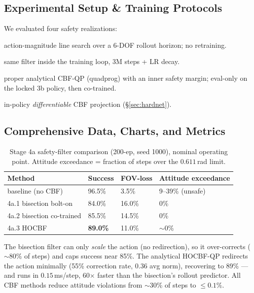 \documentclass[11pt]{article}
\begin{document}
\subsection{Experimental Setup \& Training Protocols}
We evaluated four safety realizations:
\begin{description}[nosep,leftmargin=1.4em]
  \item[4a.1 Bisection bolt-on] action-magnitude line search over a 6-DOF
  rollout horizon; no retraining.
  \item[4a.2 Bisection co-trained] same filter inside the training loop, 3M
  steps + LR decay.
  \item[4a.3 HOCBF] proper analytical CBF-QP (quadprog) with an inner safety
  margin; eval-only on the locked 3b policy, then co-trained.
  \item[4a.4 HardNet] in-policy \emph{differentiable} CBF projection
  (\S\ref{sec:hardnet}).
\end{description}

\subsection{Comprehensive Data, Charts, and Metrics}
\begin{table}[H]\centering\small
\caption{Stage 4a safety-filter comparison (200-ep, seed 1000), nominal
operating point. Attitude exceedance = fraction of steps over the $0.611\,$rad
limit.}
\begin{tabular}{@{}llll@{}}
\toprule
Method & Success & FOV-loss & Attitude exceedance \\
\midrule
baseline (no CBF) & 96.5\% & 3.5\% & 9--39\% (unsafe) \\
4a.1 bisection bolt-on & 84.0\% & 16.0\% & 0\% \\
4a.2 bisection co-trained & 85.5\% & 14.5\% & 0\% \\
4a.3 HOCBF & \textbf{89.0\%} & 11.0\% & $\sim$0\% \\
\bottomrule
\end{tabular}
\end{table}
The bisection filter can only \emph{scale} the action (no redirection), so it
over-corrects ($\sim$80\% of steps) and caps success near 85\%. The analytical
HOCBF-QP redirects the action minimally (55\% correction rate, $0.36$ avg
norm), recovering to 89\% --- and runs in $0.15\,$ms/step, 60$\times$ faster
than the bisection's rollout predictor. All CBF methods reduce attitude
violations from $\sim$30\% of steps to $\le0.1\%$.
\end{document}
